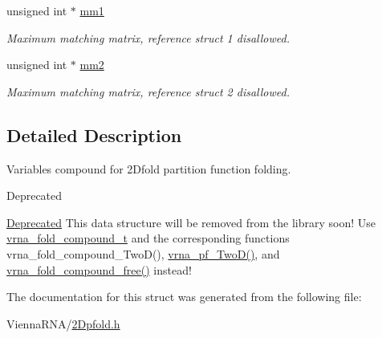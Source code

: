 \begin{DoxyCompactItemize}
\mbox{\label{structTwoDpfold__vars_a7c9e9af6224d4696118e05835441863d}} 
unsigned int $\ast$ \hyperlink{structTwoDpfold__vars_a7c9e9af6224d4696118e05835441863d}{mm1}
\begin{DoxyCompactList}\small\item\em Maximum matching matrix, reference struct 1 disallowed. \end{DoxyCompactList}\item 
\mbox{\label{structTwoDpfold__vars_affb913470783f9edb12a0bfc22466269}} 
unsigned int $\ast$ \hyperlink{structTwoDpfold__vars_affb913470783f9edb12a0bfc22466269}{mm2}
\begin{DoxyCompactList}\small\item\em Maximum matching matrix, reference struct 2 disallowed. \end{DoxyCompactList}\end{DoxyCompactItemize}


\subsection{Detailed Description}
Variables compound for 2\+Dfold partition function folding. 

\begin{DoxyRefDesc}{Deprecated}
\item[\hyperlink{deprecated__deprecated000006}{Deprecated}]This data structure will be removed from the library soon! Use \hyperlink{group__fold__compound_ga1b0cef17fd40466cef5968eaeeff6166}{vrna\+\_\+fold\+\_\+compound\+\_\+t} and the corresponding functions vrna\+\_\+fold\+\_\+compound\+\_\+\+Two\+D(), \hyperlink{group__kl__neighborhood__pf_ga0bc3427689bd09da09b8b3094a27f836}{vrna\+\_\+pf\+\_\+\+Two\+D()}, and \hyperlink{group__fold__compound_ga576a077b418a9c3650e06f8e5d296fc2}{vrna\+\_\+fold\+\_\+compound\+\_\+free()} instead! \end{DoxyRefDesc}


The documentation for this struct was generated from the following file\+:\begin{DoxyCompactItemize}
\item 
Vienna\+R\+N\+A/\hyperlink{2Dpfold_8h}{2\+Dpfold.\+h}\end{DoxyCompactItemize}
